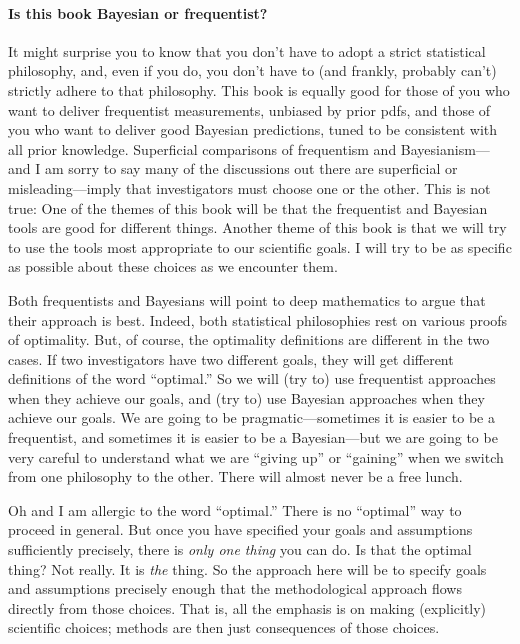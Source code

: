 \paragraph{Is this book Bayesian or frequentist?}
It might surprise you to know that you don't have to adopt a strict statistical philosophy, and, even if you do, you don't have to (and frankly, probably can't) strictly adhere to that philosophy.
This book is equally good for those of you who want to deliver frequentist measurements, unbiased by prior pdfs, and those of you who want to deliver good Bayesian predictions, tuned to be consistent with all prior knowledge.
Superficial comparisons of frequentism and Bayesianism---and I am sorry to say many of the discussions out there are superficial or misleading---imply that investigators must choose one or the other.
This is not true:
One of the themes of this book will be that the frequentist and Bayesian tools are good for different things.
Another theme of this book is that we will try to use the tools most appropriate to our scientific goals.
I will try to be as specific as possible about these choices as we encounter them.

Both frequentists and Bayesians will point to deep mathematics to argue that their approach is best.
Indeed, both statistical philosophies rest on various proofs of optimality.
But, of course, the optimality definitions are different in the two cases.
If two investigators have two different goals, they will get different definitions of the word ``optimal.''
So we will (try to) use frequentist approaches when they achieve our goals, and (try to) use Bayesian approaches when they achieve our goals.
We are going to be pragmatic---sometimes it is easier to be a frequentist, and sometimes it is easier to be a Bayesian---but we are going to be very careful to understand what we are ``giving up'' or ``gaining'' when we switch from one philosophy to the other.
There will almost never be a free lunch.

Oh and I am allergic to the word ``optimal.''
There is no ``optimal'' way to proceed in general.
But once you have specified your goals and assumptions sufficiently precisely, there is \emph{only one thing} you can do.
Is that the optimal thing? Not really. It is \emph{the} thing.
So the approach here will be to specify goals and assumptions precisely enough that the methodological approach flows directly from those choices.
That is, all the emphasis is on making (explicitly) scientific choices; methods are then just consequences of those choices.

